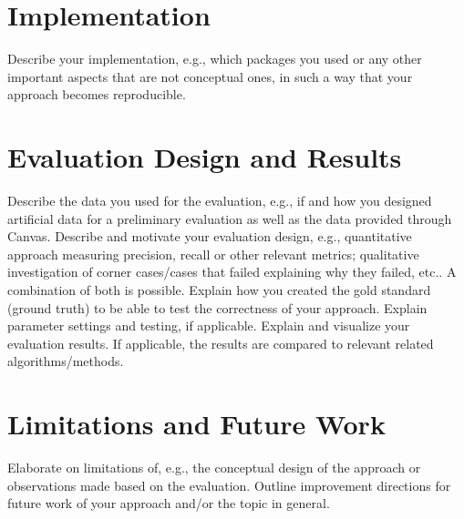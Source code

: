 \documentclass{article}
\begin{document}
\section{Implementation}\label{sec:implementation}
Describe your implementation, e.g., which packages you used or any other important aspects that are not conceptual ones, in such a way that your approach becomes reproducible.

\section{Evaluation Design and Results}\label{sec:evaluation}
Describe the data you used for the evaluation, e.g., if and how you designed artificial data for a preliminary evaluation as well as the data provided through Canvas.
Describe and motivate your evaluation design, e.g., quantitative approach measuring precision, recall or other relevant metrics; qualitative investigation of corner cases/cases that failed explaining why they failed, etc.. A combination of both is possible. Explain how you created the gold standard (ground truth) to be able to test the correctness of your approach. Explain parameter settings and testing, if applicable.
Explain and visualize your evaluation results.
If applicable, the results are compared to relevant related algorithms/methods.

\section{Limitations and Future Work}\label{sec:limitations_futurework}
Elaborate on limitations of, e.g., the conceptual design of the approach or observations made based on the evaluation. Outline improvement directions for future work of your approach and/or the topic in general.

\printbibliography
\end{document}
